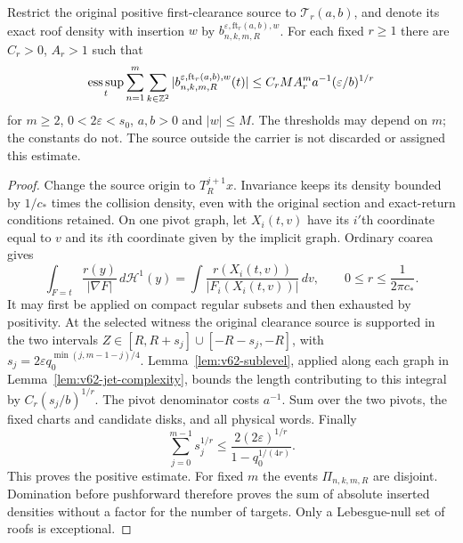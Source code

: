 \begin{theorem}
\label{thm:v62-finite-type-height}
Restrict the original positive first-clearance source to
$\mathcal T_r(a,b)$, and denote its exact roof density with insertion
$w$ by $b^{\varepsilon,\mathrm{ft}_r(a,b),w}_{n,k,m,R}$.
For each fixed $r\ge1$ there are $C_r>0$, $A_r>1$ such that
\begin{equation}\label{eq:v62-finite-type-height}
 \operatorname*{ess\,sup}_t\sum_{n=1}^m\sum_{k\in\Z^2}
 |b^{\varepsilon,\mathrm{ft}_r(a,b),w}_{n,k,m,R}(t)|
 \le C_r M A_r^m a^{-1}(\varepsilon/b)^{1/r}
\end{equation}
for $m\ge2$, $0<2\varepsilon<s_0$, $a,b>0$ and $|w|\le M$.
The thresholds may depend on $m$; the constants do not. The source
outside the carrier is not discarded or assigned this estimate.
\end{theorem}
\begin{proof}
Change the source origin to $T_R^{j+1}x$. Invariance keeps its density
bounded by $1/c_*$ times the collision density, even with the original
section and exact-return conditions retained. On one pivot graph,
let $X_i(t,v)$ have its $i'$th coordinate equal to $v$ and its
$i$th coordinate given by the implicit graph. Ordinary coarea gives
\[
 \int_{F=t}\frac{r(y)}{|\nabla F|}\,d\mathcal H^1(y)
   =\int\frac{r(X_i(t,v))}{|F_i(X_i(t,v))|}\,dv,
       \qquad 0\le r\le\frac1{2\pi c_*}.
\]
It may first be applied on compact regular subsets and then exhausted
by positivity. At the selected witness the original clearance source
is supported in the two intervals
$Z\in[R,R+s_j]\cup[-R-s_j,-R]$, with
$s_j=2\varepsilon q_0^{\min(j,m-1-j)/4}$.
Lemma~\ref{lem:v62-sublevel}, applied along each graph in
Lemma~\ref{lem:v62-jet-complexity}, bounds the length contributing to
this integral by $C_r(s_j/b)^{1/r}$. The pivot denominator costs $a^{-1}$.
Sum over the two pivots, the fixed charts and candidate disks, and all
physical words. Finally
\[
 \sum_{j=0}^{m-1}s_j^{1/r}
       \le \frac{2(2\varepsilon)^{1/r}}{1-q_0^{1/(4r)}}.
\]
This proves the positive estimate. For fixed $m$ the events
$\Pi_{n,k,m,R}$ are disjoint. Domination before pushforward therefore
proves the sum of absolute inserted densities without a factor for
the number of targets. Only a Lebesgue-null set of roofs is exceptional.
\end{proof}

